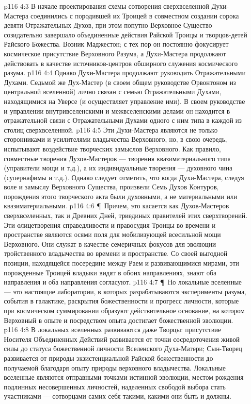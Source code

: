 \vs p116 4:3 В начале проектирования схемы сотворения сверхвселенной Духи\hyp{}Мастера соединились с породившей их Троицей в совместном создании сорока девяти Отражательных Духов, при этом попутно Верховное Существо созидательно завершало объединенные действия Райской Троицы и творцов\hyp{}детей Райского Божества. Возник Маджестон; с тех пор он постоянно фокусирует космическое присутствие Верховного Разума, а Духи\hyp{}Мастера продолжают действовать в качестве источников\hyp{}центров обширного служения космического разума.
\vs p116 4:4 Однако Духи\hyp{}Мастера продолжают руководить Отражательными Духами. Седьмой же Дух\hyp{}Мастер (в своем общем руководстве Орвонтоном из центральной вселенной) лично связан с семью Отражательными Духами, находящимися на Уверсе (и осуществляет управление ими). В своем руководстве и управлении внутривселенскими и межвселенскими делами он находится в отражательной связи с Отражательными Духами одного с ним типа в каждой из столиц сверхвселенной.
\vs p116 4:5 Эти Духи\hyp{}Мастера являются не только сторонниками и усилителями владычества Верховного, но, в свою очередь, испытывают воздействие творческих замыслов Верховного. Как правило, совместные творения Духов\hyp{}Мастеров --- творения квазиматериального типа (управители мощи и т.д.), а их индивидуальные творения --- духовного чина (супернафимы и т.д.). Однако следует отметить, что когда Духи\hyp{}Мастера, следуя воле и замыслу Верховного Существа,  произвели Семь Духов Контуров, порождения этого творческого акта были духовными, а не материальными или квазиматериальными.
\vs p116 4:6 \P\ Причем, это касается как Духов\hyp{}Мастеров сверхвселенных, так и Древних Дней, триединых правителей этих сверхтворений. Эти олицетворения справедливости и правосудия Троицы во времени и пространстве являются осями поля для мобилизующей всесильной мощи Верховного. Они служат в качестве семеричных фокусов для эволюции тройственного владычества во времени и пространстве. Со своей выгодной позиции, находящейся посередине между Раем и развивающимися мирами, эти порожденные Троицей владыки видят в обоих направлениях, знают оба направления и оба направления согласуют.
\vs p116 4:7 \P\ Но локальные вселенные --- это настоящие лаборатории, в которых разрабатываются эксперименты разума, события в галактике, раскрытия божественности и прогресс личности, которые при космическом суммировании образуют действительное основание, на котором Верховный в опыте и посредством опыта достигает божественной эволюции.
\vs p116 4:8 В локальных вселенных развиваются даже Творцы: присутствие Носителя Объединенных Действий развивается от точки сосредоточения живой силы до статуса божественной личности Вселенского Духа\hyp{}Матери; Сын\hyp{}Творец развивается от природы экзистенциальной Райской божественности до получаемой благодаря опыту природы верховного владычества. Локальные вселенные являются отправными точками истинной эволюции, местом рождения подлинных несовершенных личностей, наделенных свободой выбора стать участниками --- сотворцами самих себя такими, какими они быть и должны.
